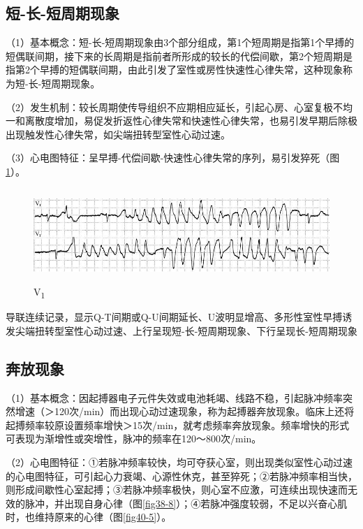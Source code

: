 \protect\hypertarget{text00047.htmlux5cux23subid536}{}{}

\subsection{短-长-短周期现象}

（1）基本概念：短-长-短周期现象由3个部分组成，第1个短周期是指第1个早搏的短偶联间期，接下来的长周期是指前者所形成的较长的代偿间歇，第2个短周期是指第2个早搏的短偶联间期，由此引发了室性或房性快速性心律失常，这种现象称为短-长-短周期现象。

（2）发生机制：较长周期使传导组织不应期相应延长，引起心房、心室复极不均一和离散度增加，易促发折返性心律失常和快速性心律失常，也易引发早期后除极出现触发性心律失常，如尖端扭转型室性心动过速。

（3）心电图特征：呈早搏-代偿间歇-快速性心律失常的序列，易引发猝死（图\ref{fig40-4}）。

\begin{figure}[!htbp]
 \centering
 \includegraphics[width=5.625in,height=1.39583in]{./images/Image00665.jpg}
 \captionsetup{justification=centering}
 \caption{V\textsubscript{1}}
 \label{fig40-4}
  \end{figure} 
导联连续记录，显示Q-T间期或Q-U间期延长、U波明显增高、多形性室性早搏诱发尖端扭转型室性心动过速、上行呈现短-长-短周期现象、下行呈现长-短周期现象

\protect\hypertarget{text00047.htmlux5cux23subid537}{}{}

\subsection{奔放现象}

（1）基本概念：因起搏器电子元件失效或电池耗竭、线路不稳，引起脉冲频率突然增速（＞120次/min）而出现心动过速现象，称为起搏器奔放现象。临床上还将起搏频率较原设置频率增快＞15次/min，就考虑频率奔放现象。频率增快的形式可表现为渐增性或突增性，脉冲的频率在120～800次/min。

（2）心电图特征：①若脉冲频率较快，均可夺获心室，则出现类似室性心动过速的心电图特征，可引起心力衰竭、心源性休克，甚至猝死；②若脉冲频率相当快，则形成间歇性心室起搏；③若脉冲频率极快，则心室不应激，可连续出现快速而无效的脉冲，并出现自身心律（图\ref{fig38-8}）；④若脉冲强度较弱，不足以兴奋心肌时，也维持原来的心律（图\ref{fig40-5}）。

